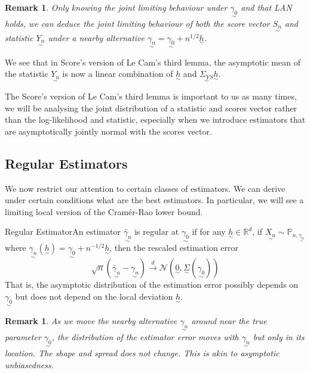 \documentclass[twoside]{article}
\newtheorem{remark}[theorem]{Remark}
\newcommand{\prob}{\mathbb{P}}
\newcommand{\utilde}{\underset{\sim}}
\begin{document}
\begin{remark}Only knowing the joint limiting behaviour under $\utilde{\gamma_{0}}$ and that LAN holds, we can deduce the joint limiting behaviour of both the score vector $\utilde{S_{n}}$ and statistic $\utilde{Y_{n}}$ under a nearby alternative $\utilde{\gamma_{n}} = \utilde{\gamma_0} + n^{1/2}\utilde{h}$.
\end{remark}

We see that in Score's version of Le Cam's third lemma, the asymptotic mean of the statistic $\utilde{Y_n}$ is now a linear combination of $\utilde{h}$ and $\utilde{\Sigma_{YS}}\utilde{h}$.

The Score's version of Le Cam's third lemma is important to us as many times, we will be analysing the joint distribution of a statistic and scores vector rather than the log-likelihood and statistic, especially when we introduce estimators that are asymptotically jointly normal with the scores vector.



\subsection{Regular Estimators}

We now restrict our attention to certain classes of estimators. We can derive under certain conditions what are the best estimators. In particular, we will see a limiting local version of the Cramér-Rao lower bound.

\begin{definition_exam}{Regular Estimator}{}An estimator $\tilde{\utilde{\gamma_n}}$ is regular at $\utilde{\gamma_0}$ if for any $\utilde{h} \in \mathbb{R}^d$, if $\utilde{X_{n}} \sim \prob_{n, \utilde{\gamma_{n}}}$ where $\utilde{\gamma_n}(\utilde{h}) = \utilde{\gamma_0} + n^{-1/2}\utilde{h}$, then the rescaled estimation error
\begin{equation}
\sqrt{n}(\tilde{\utilde{\gamma_n}} - \utilde{\gamma_n}) \xrightarrow{d} \mathcal{N}(\utilde{0}, \utilde{\Sigma}(\utilde{\gamma_{0}}))
\end{equation}
That is, the asymptotic distribution of the estimation error possibly depends on $\utilde{\gamma_0}$ but does not depend on the local deviation $\utilde{h}$. 
\end{definition_exam}

\begin{remark}
As we move the nearby alternative $\utilde{\gamma_n}$ around near the true parameter $\utilde{\gamma_0}$, the distribution of the estimator error moves with $\utilde{\gamma_n}$ but only in its location. The shape and spread does not change. This is akin to asymptotic unbiasedness.
\end{remark}
\end{document}
